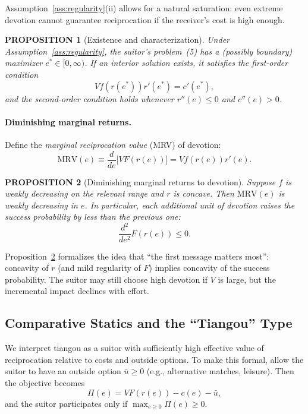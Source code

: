 \documentclass[AER]{AEA}
\newtheorem{proposition}{PROPOSITION}
\begin{document}
Assumption~\ref{ass:regularity}(ii) allows for a natural saturation: even extreme
devotion cannot guarantee reciprocation if the receiver's cost is high enough.

\begin{proposition}[Existence and characterization]\label{prop:existence}
  Under Assumption~\ref{ass:regularity}, the suitor's problem~(5) has a (possibly
  boundary) maximizer $e^* \in [0, \infty)$. If an interior solution exists, it satisfies
  the first-order condition
  \begin{equation}
    Vf(r(e^*))r'(e^*) = c'(e^*),
  \end{equation}
  and the second-order condition holds whenever $r''(e) \leq 0$ and $c''(e) > 0$.
\end{proposition}

\paragraph{Diminishing marginal returns.} Define the \textit{marginal reciprocation
value} (MRV) of devotion:
\begin{equation}
  \mathrm{MRV}(e) \equiv \frac{d}{de}\bigl[VF(r(e))\bigr] = Vf(r(e))r'(e).
\end{equation}

\begin{proposition}[Diminishing marginal returns to devotion]\label{prop:dmr}
  Suppose $f$ is weakly decreasing on the relevant range and $r$ is concave. Then
  $\mathrm{MRV}(e)$ is weakly decreasing in $e$. In particular, each additional unit of
  devotion raises the success probability by less than the previous one:
  \begin{equation}
    \frac{d^2}{de^2} F(r(e)) \leq 0.
  \end{equation}
\end{proposition}

Proposition~\ref{prop:dmr} formalizes the idea that ``the first message matters most'':
concavity of $r$ (and mild regularity of $F$) implies concavity of the success
probability. The suitor may still choose high devotion if $V$ is large, but the
incremental impact declines with effort.

\subsection{Comparative Statics and the ``Tiangou'' Type}

We interpret tiangou as a suitor with sufficiently high effective value of reciprocation
relative to costs and outside options. To make this formal, allow the suitor to have an
outside option $\bar{u} \geq 0$ (e.g., alternative matches, leisure). Then the objective
becomes
\begin{equation}
  \Pi(e) = VF(r(e)) - c(e) - \bar{u},
\end{equation}
and the suitor participates only if $\max_{e \geq 0} \Pi(e) \geq 0$.
\end{document}

